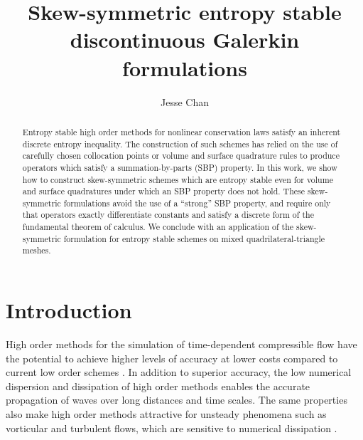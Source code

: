 \documentclass{svjour3}                     %
\date{}
\author{Jesse Chan}
\title{Skew-symmetric entropy stable discontinuous Galerkin formulations}
\begin{document}


\maketitle

\begin{abstract}
Entropy stable high order methods for nonlinear conservation laws satisfy an inherent discrete entropy inequality.  The construction of such schemes has relied on the use of carefully chosen collocation points \cite{gassner2013skew, fisher2013high, carpenter2014entropy, chan2018efficient} or volume and surface quadrature rules \cite{chan2017discretely, chan2018discretely} to produce operators which satisfy a summation-by-parts (SBP) property.  In this work, we show how to construct skew-symmetric schemes which are entropy stable even for volume and surface quadratures under which an SBP property does not hold.  These skew-symmetric formulations avoid the use of a ``strong'' SBP property, and require only that operators exactly differentiate constants and satisfy a discrete form of the fundamental theorem of calculus.   We conclude with an application of the skew-symmetric formulation for entropy stable schemes on mixed quadrilateral-triangle meshes. 
\end{abstract}


\section{Introduction}

High order methods for the simulation of time-dependent compressible flow have the potential to achieve higher levels of accuracy at lower costs compared to current low order schemes \cite{wang2013high}.  In addition to superior accuracy, the low numerical dispersion and dissipation of high order methods \cite{ainsworth2004dispersive} enables the accurate propagation of waves over long distances and time scales.  The same properties also make high order methods attractive for unsteady phenomena such as vorticular and turbulent flows, which are sensitive to numerical dissipation \cite{visbal1999high, wang2013high}.  
\end{document}
